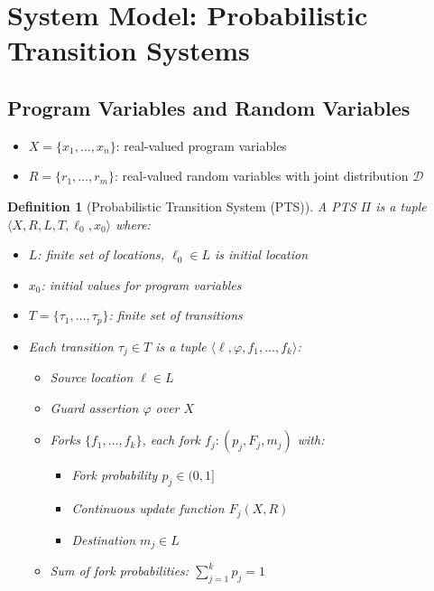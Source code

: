 \documentclass{article}
\newtheorem{definition}{Definition}
\begin{document}
\section{System Model: Probabilistic Transition Systems}

\subsection{Program Variables and Random Variables}

\begin{itemize}
    \item $X = \{x_1, \ldots, x_n\}$: real-valued program variables
    \item $R = \{r_1, \ldots, r_m\}$: real-valued random variables with joint distribution $\mathcal{D}$
\end{itemize}

\begin{definition}[Probabilistic Transition System (PTS)]
A PTS $\Pi$ is a tuple $\langle X, R, L, T, \ell_0, x_0 \rangle$ where:
\begin{itemize}
    \item $L$: finite set of locations, $\ell_0 \in L$ is initial location
    \item $x_0$: initial values for program variables
    \item $T = \{\tau_1, \ldots, \tau_p\}$: finite set of transitions
    \item Each transition $\tau_j \in T$ is a tuple $\langle \ell, \varphi, f_1, \ldots, f_k \rangle$:
    \begin{itemize}
        \item Source location $\ell \in L$
        \item Guard assertion $\varphi$ over $X$
        \item Forks $\{f_1, \ldots, f_k\}$, each fork $f_j: (p_j, F_j, m_j)$ with:
        \begin{itemize}
            \item Fork probability $p_j \in (0, 1]$
            \item Continuous update function $F_j(X, R)$
            \item Destination $m_j \in L$
        \end{itemize}
        \item Sum of fork probabilities: $\sum_{j=1}^k p_j = 1$
    \end{itemize}
\end{itemize}
\end{definition}
\end{document}
